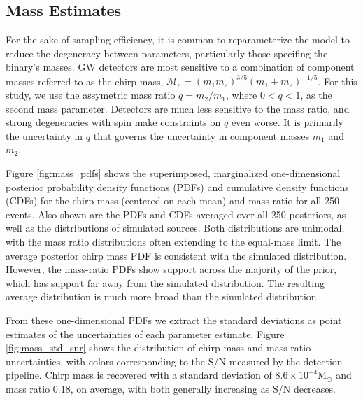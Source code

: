 \subsection{Mass Estimates}

For the sake of sampling efficiency, it is common to reparameterize the model to reduce the degeneracy between parameters, particularly those specifing the binary's masses.  GW detectors are most sensitive to a combination of component masses referred to as the chirp mass, $\mathcal{M}_\mathrm{c} = (m_1 m_2)^{3/5} (m_1 + m_2)^{-1/5}$.  For this study, we use the assymetric mass ratio $q = m_2/m_1$, where $0 < q < 1$, as the second mass parameter.  Detectors are much less sensitive to the mass ratio, and strong degeneracies with spin make constraints on $q$ even worse.  It is primarily the uncertainty in $q$ that governs the uncertainty in component masses $m_1$ and $m_2$.

Figure \ref{fig:mass_pdfs} shows the superimposed, marginalized one-dimensional posterior probability density functions (PDFs) and cumulative density functions (CDFs) for the chirp-mass (centered on each mean) and mass ratio for all 250 events.  Also shown are the PDFs and CDFs averaged over all 250 posteriors, as well as the distributions of simulated sources.  Both distributions are unimodal, with the mass ratio distributions often extending to the equal-mass limit.  The average posterior chirp mass PDF is consistent with the simulated distribution.  However, the mass-ratio PDFs show support across the majority of the prior, which has support far away from the simulated distribution.  The resulting average distribution is much more broad than the simulated distribution.

From these one-dimensional PDFs we extract the standard deviations as point estimates of the uncertainties of each parameter estimate.  Figure \ref{fig:mass_std_snr} shows the distribution of chirp mass and mass ratio uncertainties, with colors corresponding to the S/N measured by the detection pipeline.  Chirp mass is recovered with a standard deviation of $8.6 \times 10^{-4} \mathrm{M}_\odot$ and mass ratio $0.18$, on average, with both generally increasing as S/N decreases.